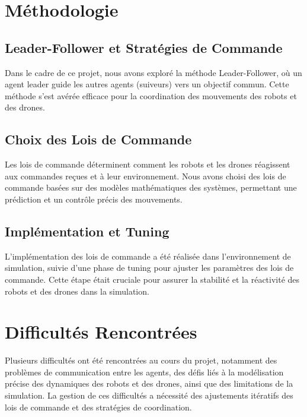 \documentclass[a4paper,12pt]{article}
\begin{document}
\section*{Méthodologie}
\subsection*{Leader-Follower et Stratégies de Commande}
Dans le cadre de ce projet, nous avons exploré la méthode Leader-Follower, où un agent leader guide les autres agents (suiveurs) vers un objectif commun. Cette méthode s'est avérée efficace pour la coordination des mouvements des robots et des drones.

\subsection*{Choix des Lois de Commande}
Les lois de commande déterminent comment les robots et les drones réagissent aux commandes reçues et à leur environnement. Nous avons choisi des lois de commande basées sur des modèles mathématiques des systèmes, permettant une prédiction et un contrôle précis des mouvements.

\subsection*{Implémentation et Tuning}
L'implémentation des lois de commande a été réalisée dans l'environnement de simulation, suivie d'une phase de tuning pour ajuster les paramètres des lois de commande. Cette étape était cruciale pour assurer la stabilité et la réactivité des robots et des drones dans la simulation.

\section*{Difficultés Rencontrées}
Plusieurs difficultés ont été rencontrées au cours du projet, notamment des problèmes de communication entre les agents, des défis liés à la modélisation précise des dynamiques des robots et des drones, ainsi que des limitations de la simulation. La gestion de ces difficultés a nécessité des ajustements itératifs des lois de commande et des stratégies de coordination.
\end{document}
